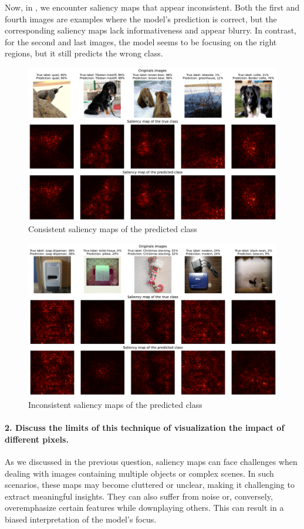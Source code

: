 Now, in , we encounter saliency maps that appear inconsistent. Both the first and fourth images are examples where the model's prediction is correct, but the corresponding saliency maps lack informativeness and appear blurry. In contrast, for the second and last images, the model seems to be focusing on the right regions, but it still predicts the wrong class.

\begin{figure}[H]
    \centering
    \includegraphics[width=.95\textwidth]{figs/2b/good_saliency_map.pdf}
    \caption{Consistent saliency maps of the predicted class}
    \label{fig:good_saliency_map}
\end{figure}

\begin{figure}[H]
    \centering  
    \includegraphics[width=.95\textwidth]{figs/2b/bad_saliency_map.pdf}
    \caption{Inconsistent saliency maps of the predicted class}
    \label{fig:bad_saliency_map}
\end{figure}

\paragraph*{2. Discuss the limits of this technique of visualization the impact of different pixels.}
As we discussed in the previous question, saliency maps can face challenges when dealing with images containing multiple objects or complex scenes. In such scenarios, these maps may become cluttered or unclear, making it challenging to extract meaningful insights. They can also suffer from noise or, conversely, overemphasize certain features while downplaying others. This can result in a biased interpretation of the model's focus.

